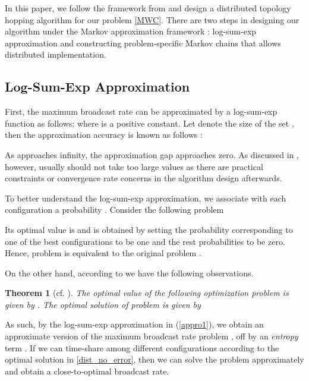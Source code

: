 \documentclass[10pt,conference]{IEEEtran}
\newtheorem{theorem}{\bf Theorem}
\begin{document}
In this paper, we follow the framework from \cite{MA:CLSC10} and design a distributed topology hopping algorithm for our problem \eqref{MWC}. There are two steps in designing
our algorithm under the Markov approximation framework \cite{MA:CLSC10}:
log-sum-exp approximation and constructing problem-specific Markov chains that allows distributed implementation.

\begin{comment}
The idea behind our design is to let the P2P system adapt peer configurations
to pursue good-performance topologies and stay in them for majority
of the time.
\end{comment}
{}


\subsection{Log-Sum-Exp Approximation}

First, the maximum broadcast rate can be approximated by a log-sum-exp
function as follows: 
 where  is a positive constant. Let  denote
the size of the set , then the approximation accuracy
is known as follows \cite{MA:CLSC10}: 


As  approaches infinity, the approximation gap approaches
zero. As discussed in \cite{MA:CLSC10}, however, usually  should not
take too large values as there are practical constraints or convergence
rate concerns in the algorithm design afterwards.

To better understand the log-sum-exp approximation, we associate with each configuration 
a probability . Consider the following problem

Its optimal value is  and is obtained by setting the probability corresponding to one of the best configurations
to be one and the rest probabilities to be zero. Hence, problem 
is equivalent to the original problem .

On the other hand, according to \cite{MA:CLSC10} we have the following
observations.
\begin{theorem}[cf. \cite{MA:CLSC10}] The optimal value of the following
optimization problem 
is given by .
The optimal solution of problem  is given by

 \end{theorem}

As such, by the log-sum-exp approximation in (\ref{appro1}),
we obtain an approximate version of the maximum broadcast rate problem
, off by an \emph{entropy }term .
If we can time-share among different configurations according
to the optimal solution  in \eqref{dist_no_error},
then we can solve the problem  approximately and obtain
a close-to-optimal broadcast rate.
\end{document}

